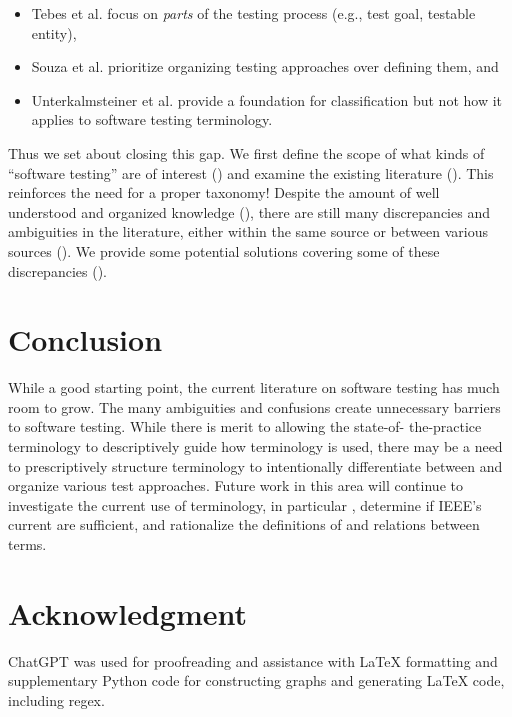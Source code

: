 \documentclass[conference]{IEEEtran}
\begin{document}
\begin{itemize}
    \item Tebes et al. \cite{TebesEtAl2020a} focus on \emph{parts} of the
          testing process (e.g., test goal, testable entity),
    \item Souza et al. \cite{SouzaEtAl2017} prioritize organizing testing
          approaches over defining them, and
    \item Unterkalmsteiner et al. \cite{UnterkalmsteinerEtAl2014} provide a
          foundation for classification but not how it applies to software
          testing terminology.
\end{itemize}

Thus we set about closing this gap. We first define the scope of what kinds of
``software testing'' are of interest () and examine the existing
literature (). This reinforces the need for a proper taxonomy!
Despite the amount of well understood and organized knowledge (),
there are still many discrepancies and ambiguities in the literature, either
within the same source or between various sources (). We provide
some potential solutions covering some of these discrepancies ().







\section{Conclusion}

While a good starting point, the current literature on software testing has
much room to grow. The many ambiguities and confusions create unnecessary
barriers to software testing. While there is merit to allowing the state-of-%
the-practice terminology to descriptively guide how terminology is used, there
may be a need to prescriptively structure terminology to intentionally
differentiate between and organize various test approaches. Future work in this
area will continue to investigate the current use of terminology, in
particular , determine if IEEE's current
 are sufficient, and rationalize the definitions of
and relations between terms.

\section*{Acknowledgment}

ChatGPT was used for proofreading and assistance with \LaTeX{} formatting and
supplementary Python code for constructing graphs and generating \LaTeX{} code,
including regex.

\newpage



\end{document}

